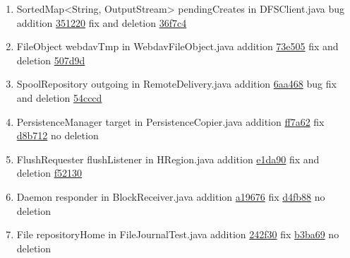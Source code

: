 \begin{figure*}[!htb]
\begin{minipage}{1\textwidth}
\begin{enumerate}
\item SortedMap<String, OutputStream> pendingCreates in DFSClient.java bug addition \href{https://github.com/apache/hadoop/commit/3512203f6c54033db1d52118edf595e5b5e1335e#diff-ad9e40bbf27e54506a64a57c691acc01}{351220}   fix and deletion \href{https://github.com/apache/hadoop/commit/36f7c4360#diff-1c2cc53548a274cf6eff37f3ded5dbbb}{36f7c4} 
\item  FileObject webdavTmp in WebdavFileObject.java addition  \href{https://github.com/apache/commons-vfs/commit/c5451d949d67c415863565dcb56a6b2608a3aad0#diff-6ac9cecfbc1506096ed3445c48318795}{73e505}  fix and deletion \href{https://github.com/apache/commons-vfs/commit/507d9d2061d4ea8c4ed4c26a5aad4f18aa493e67?diff=unified#diff-5a9a853727565aea8ec4f5670cafa120}{507d9d}  %
\item  SpoolRepository outgoing in RemoteDelivery.java addition \href{https://github.com/apache/james/commit/6aa468ab069ce094027839b0282c47971598f28a#diff-53334ca0c55bca9fd6821a895f6ec46b}{6aa468}  bug fix and deletion \href{https://github.com/apache/james/commit/54cccd3#diff-53334ca0c55bca9fd6821a895f6ec46b}{54cccd} 
\item  PersistenceManager target in PersistenceCopier.java addition \href{https://github.com/apache/jackrabbit/commit/ff7a62c0a8768714f8c36e3f8f07d2f017eebbfe#diff-7df848bb75ab7d3df5738968da840306}{ff7a62} fix  \href{https://github.com/apache/jackrabbit/commit/d8b712#diff-7df848bb75ab7d3df5738968da840306}{d8b712}  no deletion
\item  FlushRequester flushListener in HRegion.java addition \href{https://github.com/apache/hbase/commit/e1da900df#diff-b9d8ad451ab3fd5f5ff8593268230822}{e1da90}  fix and deletion \href{https://github.com/apache/hbase/commit/f52130953245d93489a9c700c3b00eedbe70fdb9/src/main/java/org/apache/hadoop/hbase/regionserver/HRegion.java}{f52130} 
\item  Daemon responder in BlockReceiver.java addition \href{https://github.com/apache/hadoop/commit/a196766ea07775f18ded69bd9e8d239f8cfd3ccc#diff-9400d498326ceaca4b310cd3415277ef}{a19676}  fix \href{https://github.com/apache/hadoop/commit/d4fb8821#diff-649c4e46d99ae8011ff0fa0c118d9726}{d4fb88}  no deletion 
\item  File repositoryHome in FileJournalTest.java addition \href{https://github.com/apache/jackrabbit/commit/242f30ca639d0830e5ffe8f38c310453210934dd#diff-0ec8ddbe8d780a64761634b465905590}{242f30}  fix \href{https://github.com/apache/jackrabbit/commit/b3ba69bce1#diff-0ec8ddbe8d780a64761634b465905590}{b3ba69}    no deletion
  \end{enumerate}
  \end{minipage}
 \end{figure*}
 

